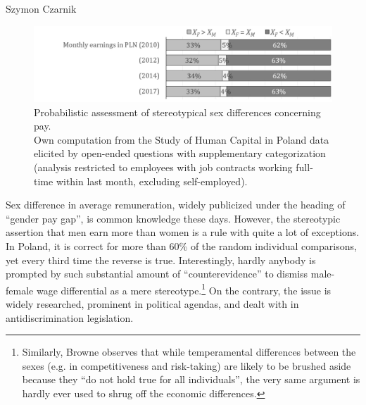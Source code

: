 \begin{artengenv}{Szymon Czarnik}
\begin{figure}[H]
	\centering
   \includegraphics[width=\textwidth]{ART_Czarnik/Czarnik-img020.jpg}
\caption{Probabilistic assessment of stereotypical sex differences concerning pay.\\
{\footnotesize Own computation from the Study of Human Capital in Poland data elicited by open-ended questions with supplementary categorization (analysis restricted to employees with job contracts working full-time within last month, excluding self-employed).  }
}\label{fig4-czar}
\end{figure}

Sex difference in average remuneration, widely publicized under the heading of ``gender pay gap'', is common knowledge these days. However, the stereotypic assertion that men earn more than women is a rule with quite a lot of exceptions. In Poland, it is correct for more than 60\% of the random individual comparisons, yet every third time the reverse is true. Interestingly, hardly anybody is prompted by such substantial amount of ``counterevidence'' to dismiss male-female wage differential as a mere stereotype.\footnote{Similarly, Browne
\parencite*[][]{browne_divided_1998} %
 observes that while temperamental differences between the sexes (e.g. in competitiveness and risk-taking) are likely to be brushed aside because they ``do not hold true for all individuals'', the very same argument is hardly ever used to shrug off the economic differences. } On the contrary, the issue is widely researched, prominent in political agendas, and dealt with in antidiscrimination legislation.


\end{artengenv}
